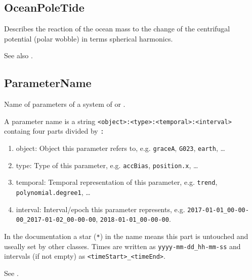 \subsection{OceanPoleTide}\label{general.fileFormat:oceanPoleTide}
Describes the reaction of the ocean mass to the change
of the centrifugal potential (polar wobble) in terms spherical harmonics.

See also .


\subsection{ParameterName}\label{general.fileFormat:parameterName}
Name of parameters of a system of  or .

A parameter name is a string \verb|<object>:<type>:<temporal>:<interval>| containg four parts divided by \verb|:|
\begin{enumerate}
\item object: Object this parameter refers to, e.g. \verb|graceA|, \verb|G023|, \verb|earth|, \ldots
\item type: Type of this parameter, e.g. \verb|accBias|, \verb|position.x|, \ldots
\item temporal: Temporal representation of this parameter, e.g. \verb|trend|, \verb|polynomial.degree1|, \ldots
\item interval: Interval/epoch this parameter represents, e.g. \verb|2017-01-01_00-00-00_2017-01-02_00-00-00|, \verb|2018-01-01_00-00-00|.
\end{enumerate}
In the documentation a star (\verb|*|) in the name means this part is untouched and useally set by other classes.
Times are written as \verb|yyyy-mm-dd_hh-mm-ss| and intervals (if not empty) as \verb|<timeStart>_<timeEnd>|.

See .

